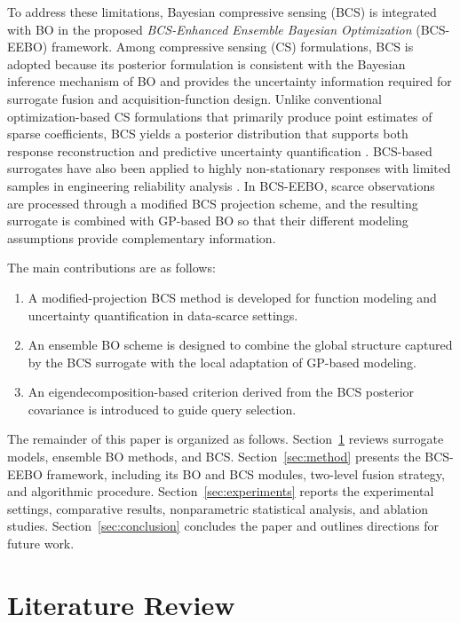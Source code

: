 \documentclass[lettersize,journal]{IEEEtran}
\begin{document}
To address these limitations, Bayesian compressive sensing (BCS) is integrated with BO in the proposed \emph{BCS-Enhanced Ensemble Bayesian Optimization} (BCS-EEBO) framework. Among compressive sensing (CS) formulations, BCS is adopted because its posterior formulation is consistent with the Bayesian inference mechanism of BO and provides the uncertainty information required for surrogate fusion and acquisition-function design. Unlike conventional optimization-based CS formulations that primarily produce point estimates of sparse coefficients, BCS yields a posterior distribution that supports both response reconstruction and predictive uncertainty quantification \cite{JiXueCarin2008BCS}. BCS-based surrogates have also been applied to highly non-stationary responses with limited samples in engineering reliability analysis \cite{LiWang2022ABCSMCS}. In BCS-EEBO, scarce observations are processed through a modified BCS projection scheme, and the resulting surrogate is combined with GP-based BO so that their different modeling assumptions provide complementary information.

The main contributions are as follows:
\begin{enumerate}
  \item A modified-projection BCS method is developed for function modeling and uncertainty quantification in data-scarce settings.
  \item An ensemble BO scheme is designed to combine the global structure captured by the BCS surrogate with the local adaptation of GP-based modeling.
  \item An eigendecomposition-based criterion derived from the BCS posterior covariance is introduced to guide query selection.
\end{enumerate}

The remainder of this paper is organized as follows. Section~\ref{sec:literature} reviews surrogate models, ensemble BO methods, and BCS. Section~\ref{sec:method} presents the BCS-EEBO framework, including its BO and BCS modules, two-level fusion strategy, and algorithmic procedure. Section~\ref{sec:experiments} reports the experimental settings, comparative results, nonparametric statistical analysis, and ablation studies. Section~\ref{sec:conclusion} concludes the paper and outlines directions for future work.

\section{Literature Review}
\label{sec:literature}
\end{document}
